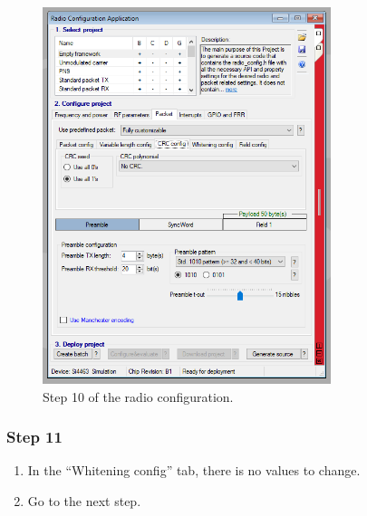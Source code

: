 \begin{figure}[!h]
	\begin{center}
		\includegraphics[width=0.75\textwidth]{figures/wds-tutorial/wds-tutorial-10.png}
		\caption{Step 10 of the radio configuration.}
		\label{fig:wds-tutorial-step-10}
	\end{center}
\end{figure}

\subsubsection{Step 11}

\begin{enumerate}
    \item In the ``Whitening config'' tab, there is no values to change.
    \item Go to the next step.
\end{enumerate}

